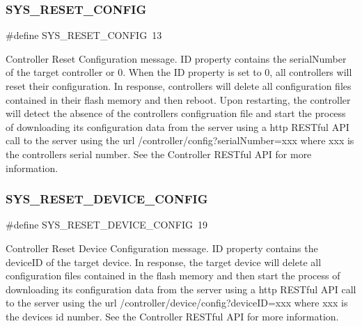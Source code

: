 \subsubsection{\texorpdfstring{S\+Y\+S\+\_\+\+R\+E\+S\+E\+T\+\_\+\+C\+O\+N\+F\+IG}{SYS\_RESET\_CONFIG}}
{\footnotesize\ttfamily \#define S\+Y\+S\+\_\+\+R\+E\+S\+E\+T\+\_\+\+C\+O\+N\+F\+IG~13}

Controller Reset Configuration message. ID property contains the serial\+Number of the target controller or 0. When the ID property is set to 0, all controllers will reset their configuration. In response, controllers will delete all configuration files contained in their flash memory and then reboot. Upon restarting, the controller will detect the absence of the controllers configruation file and start the process of downloading its configuration data from the server using a http R\+E\+S\+Tful A\+PI call to the server using the url /controller/config?serial\+Number=xxx where xxx is the controller\textquotesingle{}s serial number. See the Controller R\+E\+S\+Tful A\+PI for more information. \mbox{\label{group___u_d_p_message_i_d_gaef042a9ee57e8ddf94286a3263734468}} 
\subsubsection{\texorpdfstring{S\+Y\+S\+\_\+\+R\+E\+S\+E\+T\+\_\+\+D\+E\+V\+I\+C\+E\+\_\+\+C\+O\+N\+F\+IG}{SYS\_RESET\_DEVICE\_CONFIG}}
{\footnotesize\ttfamily \#define S\+Y\+S\+\_\+\+R\+E\+S\+E\+T\+\_\+\+D\+E\+V\+I\+C\+E\+\_\+\+C\+O\+N\+F\+IG~19}

Controller Reset Device Configuration message. ID property contains the device\+ID of the target device. In response, the target device will delete all configuration files contained in the flash memory and then start the process of downloading its configuration data from the server using a http R\+E\+S\+Tful A\+PI call to the server using the url /controller/device/config?device\+ID=xxx where xxx is the device\textquotesingle{}s id number. See the Controller R\+E\+S\+Tful A\+PI for more information. \mbox{\label{group___u_d_p_message_i_d_gab96f76ffa1af60bebfd871ca1e7c4a08}} 
